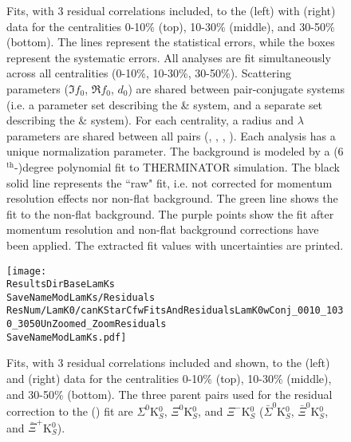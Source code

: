 \documentclass[/home/jesse/Analysis/FemtoAnalysis/AnalysisNotes/AnalysisNoteJBuxton.tex]{subfiles}
\renewcommand{\NonFlatBgdLamKch}{_NonFlatBgdCrctnPolynomial}
\renewcommand{\NonFlatBgdLamKs}{_NonFlatBgdCrctnLinear}
\renewcommand{\ResNum}{_3Res}
\renewcommand{\PrimMaxDecay}{_PrimMaxDecay10fm}
\renewcommand{\SaveNameModLamKch}{\MomRes\NonFlatBgdLamKch\ResNum\PrimMaxDecay\ResMethod\ParamFixAndShareLamKch}
\renewcommand{\SaveNameModLamKs}{\MomRes\NonFlatBgdLamKs\ResNum\PrimMaxDecay\ResMethod\ParamFixAndShareLamKs}
\begin{document}
\begin{landscape}
\begin{figure}[h!]
  \centering
  \caption[\LamKchMALamKchP Fits with 3 Residuals]{Fits, with 3 residual correlations included, to the \LamKchM(left) with \ALamKchP (right) data for the centralities 0-10\% (top), 10-30\% (middle), and 30-50\% (bottom).
 The lines represent the statistical errors, while the boxes represent the systematic errors.  
 All \LamKpm analyses are fit simultaneously across all centralities (0-10\%, 10-30\%, 30-50\%).
 Scattering parameters ($\Im f_{0}$, $\Re f_{0}$, $d_{0}$) are shared between pair-conjugate systems (i.e. a parameter set describing the \LamKchP \& \ALamKchM system, and a separate set describing the \LamKchM \& \ALamKchP system).
 For each centrality, a radius and $\lambda$ parameters are shared between all pairs (\LamKchP, \ALamKchM, \LamKchM, \ALamKchP).
 Each analysis has a unique normalization parameter.
 The background is modeled by a (6$^{\mathrm{th}}$-)degree polynomial fit to THERMINATOR simulation.
 The black solid line represents the ``raw" fit, i.e. not corrected for momentum resolution effects nor non-flat background.  
 The green line shows the fit to the non-flat background.
 The purple points show the fit after momentum resolution and non-flat background corrections have been applied.
 The extracted fit values with uncertainties are printed.}
  \label{fig:LamKchMwConjFits_3Res}
\end{figure}


\begin{figure}[h]
  \centering
  \texttt{[image: \\ResultsDirBaseLamKs\\SaveNameModLamKs/Residuals\\ResNum/LamK0/canKStarCfwFitsAndResidualsLamK0wConj\_0010\_1030\_3050UnZoomed\_ZoomResiduals\\SaveNameModLamKs.pdf]}
  \caption[\LamALamKs Fits showing 3 Residuals]{Fits, with 3 residual correlations included and shown, to the \LamKs (left) and \ALamKs (right) data for the centralities 0-10\% (top), 10-30\% (middle), and 30-50\% (bottom).  The three parent pairs used for the residual correction to the \LamKs (\ALamKs) fit are $\Sigma^{0}$K$^{0}_{S}$, $\Xi^{0}$K$^{0}_{S}$, and $\Xi^{-}$K$^{0}_{S}$ ($\bar{\Sigma}^{0}$K$^{0}_{S}$, $\bar{\Xi}^{0}$K$^{0}_{S}$, and $\bar{\Xi}^{+}$K$^{0}_{S}$).}
  \label{fig:LamK0wConjFitsAndResiduals_3Res}
\end{figure}





\end{landscape}
\end{document}
